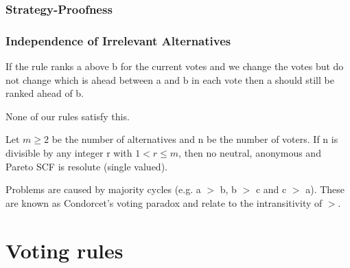 	\subsubsection{Strategy-Proofness}
	
	\subsubsection{Independence of Irrelevant Alternatives}
	If the rule ranks a above b for the current votes and we change the votes but do not change which is ahead between a and b in each vote then a should still be ranked ahead of b.
	
	None of our rules satisfy this.

	
\begin{theorem}[Moulin, 1983]
	Let $m \geq 2$ be the number of alternatives and n be the number of voters. If n is divisible by any integer r with $1 < r \leq m$, then no neutral, anonymous and Pareto SCF is resolute (single valued).
\end{theorem}

\begin{theorem}
	Problems are caused by majority cycles (e.g. a $>$ b, b $>$ c and c $>$ a). These are known as Condorcet’s voting paradox and relate to the intransitivity of $>$.
\end{theorem}

\section{Voting rules}

%
%
%
%
















